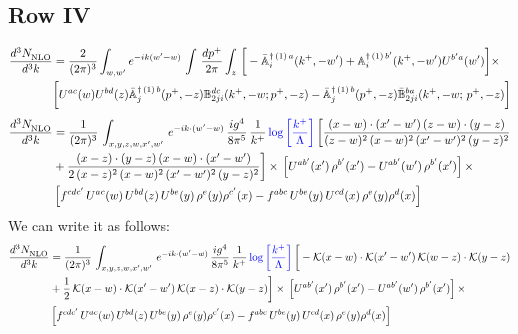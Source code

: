 \documentclass[9pt]{article}
\def\mf#1{\mathbb{#1}}
\numberwithin{equation}{section}
\begin{document}
\subsection{Row IV}
\begin{align}
 \frac{d^{3}N_{\rm NLO}^{\rm}}{d^{3}k}  & = \frac{2}{(2\pi)^{3}}  \int_{w, w^\prime} e^{-ik(w^\prime-w)}\, \int\,\frac{dp^{+}}{2\pi} \int_{z}\,\bigg[-\bar{\mf{A}}^{\dagger\,(1)\,a}_{i}(k^{+},-w^{\prime})+\mf{A}^{\dagger\, (1)\, b^{\prime}}_{i}(k^{+},-w^{\prime})U^{b^{\prime}a}(w^{\prime})\bigg]\times \notag \\ & \bigg[U^{ac}(w)U^{bd}(z) \bar{\mf{A}}^{\dagger\, (1)\, b}_{j}(p^+,- z) {\mf{B}}^{dc}_{2ji} (k^+, -w;p^+, -z) - \Bar{\mf{A}}^{\dagger\, (1)\, b}_{j}(p^{+}, -z)\Bar{\mf{B}}^{ba}_{2ji}(k^{+},-w;\,p^{+}, -z) \bigg] \nonumber
\end{align}
\begin{align}
    \frac{d^{3}N_{\rm NLO}^{\rm}}{d^{3}k}  & =  \frac{1}{(2\pi)^{3}}\,
    \int_{x,y,z,w,x',w'}\,e^{-ik\cdot (w^\prime-w)}\, \frac{ig^{4}}{8\pi^{5}}\,\frac{1}{k^{+}}\,{\color{blue}\log{\left[\frac{k^{+}}{\Lambda}\right]}}\,\bigg[\frac{(x-w)\cdot (x'-w')\,(z-w)\cdot (y-z)}{(z-w)^{2}\,(x-w)^{2}\,(x'-w')^{2}\,(y-z)^{2}}\notag \\ & +\frac{(x-z)\cdot (y-z)\,(x-w)\cdot (x'-w')}{2\, (x-z)^{2}\,(x-w)^{2}\,(x'-w')^{2}\,(y-z)^{2}}\bigg]\times\,\left[U^{ab'}(x')\,\rho^{b'}(x')-U^{ab'}(w')\,\rho^{b'}(x')\right]\times\notag \\ &  \left[f^{cdc'}\,U^{ac}(w)\,U^{bd}(z)\,U^{be}(y)\,\rho^{e}(y)\rho^{c'}(x)-f^{abc}\,U^{be}(y)\,U^{cd}(x)\,\rho^{e}(y)\rho^{d}(x)\right]
\end{align}
We can write it as follows:
\begin{align}
    \frac{d^{3}N_{\rm NLO}^{\rm}}{d^{3}k}  & =  \frac{1}{(2\pi)^{3}}\,
    \int_{x,y,z,w,x',w'}\,e^{-ik\cdot (w^\prime-w)}\, \frac{ig^{4}}{8\pi^{5}}\,\frac{1}{k^{+}}\,{\color{blue}\log{\left[\frac{k^{+}}{\Lambda}\right]}}\,\bigg[-\mathcal{K}(x-w)\cdot \mathcal{K}(x'-w')\, \mathcal{K}(w-z)\cdot \mathcal{K}(y-z)\notag \\ & +\frac{1}{2}\,\mathcal{K}(x-w)\cdot \mathcal{K}(x'-w')\, \mathcal{K}(x-z)\cdot \mathcal{K}(y-z)\bigg]\times\,\left[U^{ab'}(x')\,\rho^{b'}(x')-U^{ab'}(w')\,\rho^{b'}(x')\right]\times\notag \\ &  \left[f^{cdc'}\,U^{ac}(w)\,U^{bd}(z)\,U^{be}(y)\,\rho^{e}(y)\rho^{c'}(x)-f^{abc}\,U^{be}(y)\,U^{cd}(x)\,\rho^{e}(y)\rho^{d}(x)\right]
\end{align}
\end{document}

